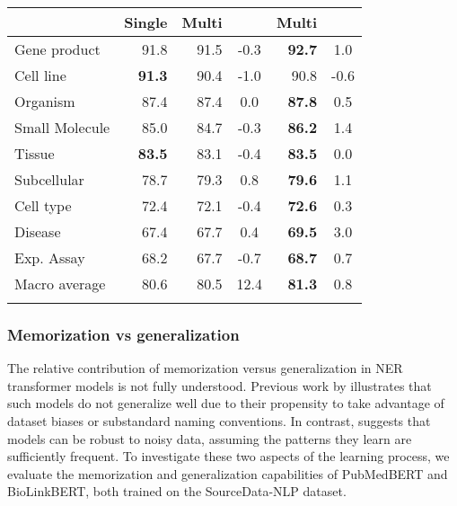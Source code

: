 \documentclass{bioinfo}
\begin{document}
\begin{table}[!h]
 {\begin{tabular}{@{}lrrc|rc@{}}\toprule
               & Single         & Multi        &  & Multi & \\\midrule
Gene product   & 91.8           & 91.5              & -0.3     &  \textbf{92.7}  & 1.0\\
Cell line      & \textbf{91.3}  & 90.4              & -1.0     &  90.8           & -0.6\\
Organism       & 87.4           & 87.4              & 0.0      &  \textbf{87.8}  & 0.5\\
Small Molecule & 85.0           & 84.7              & -0.3     &  \textbf{86.2}  & 1.4\\
Tissue         & \textbf{83.5}  & 83.1              & -0.4     &  \textbf{83.5}  & 0.0\\
Subcellular    & 78.7           & 79.3              & 0.8      &  \textbf{79.6}  & 1.1\\
Cell type      & 72.4           & 72.1              & -0.4     &  \textbf{72.6}  & 0.3\\
Disease        & 67.4           & 67.7              & 0.4      &  \textbf{69.5}  & 3.0\\
Exp. Assay     & 68.2           & 67.7              & -0.7     &  \textbf{68.7}  & 0.7\\\hline
Macro average  & 80.6           & 80.5              & 12.4     &  \textbf{81.3}  & 0.8\\ \botrule
\end{tabular}}{}
\end{table}

\subsubsection{Memorization vs generalization}\label{sec:memo-vs-gen}

The relative contribution of memorization versus generalization in NER transformer models is not fully understood. Previous work by \cite{Kim2021HowDY-memory} illustrates that such models do not generalize well due to their propensity to take advantage of dataset biases or substandard naming conventions. In contrast, \cite{Tnzer2021MemorisationVG}  suggests that models can be robust to noisy data, assuming the patterns they learn are sufficiently frequent. To investigate these two aspects of the learning process, we evaluate the memorization and generalization capabilities of PubMedBERT and BioLinkBERT, both trained on the SourceData-NLP dataset.
\end{document}
